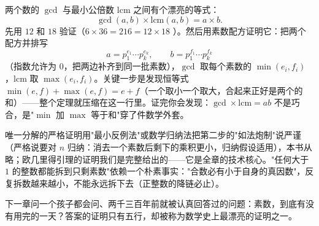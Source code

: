 \begin{shaonao}
两个数的 $\gcd$ 与最小公倍数 $\mathrm{lcm}$ 之间有个漂亮的等式：
\[
\gcd(a,b) \times \mathrm{lcm}(a,b) = a \times b .
\]
先用 $12$ 和 $18$ 验证（$6\times36 = 216 = 12\times18$ \checkmark）。然后用素数配方证明它：把两个配方并排写
\[
a = p_1^{e_1}\cdots p_k^{e_k},\qquad b = p_1^{f_1}\cdots p_k^{f_k}
\]
（指数允许为 $0$，把两边补齐到同一批素数），$\gcd$ 取每个素数的 $\min(e_i, f_i)$，$\mathrm{lcm}$ 取 $\max(e_i, f_i)$。关键一步是发现恒等式 $\min(e,f) + \max(e,f) = e + f$（一个取小一个取大，合起来正好是两个的和）——整个定理就压缩在这一行里。证完你会发现：$\gcd\times\mathrm{lcm} = ab$ 不是巧合，是"$\min$ 加 $\max$ 等于和"穿了件数学外套。
\end{shaonao}

\begin{chengshi}
唯一分解的严格证明用"最小反例法"或数学归纳法把第二步的"如法炮制"说严谨（严格说要对 $n$ 归纳：消去一个素数后剩下的乘积更小，归纳假设适用），本书从略；欧几里得引理的证明我们是完整给出的——它是全章的技术核心。"任何大于 $1$ 的整数都能拆到只剩素数"依赖一个朴素事实："合数必有小于自身的真因数"，反复拆数越来越小，不能永远拆下去（正整数的降链必止）。
\end{chengshi}

下一章问一个孩子都会问、两千三百年前就被认真回答过的问题：素数，到底有没有用完的一天？答案的证明只有五行，却被称为数学史上最漂亮的证明之一。
